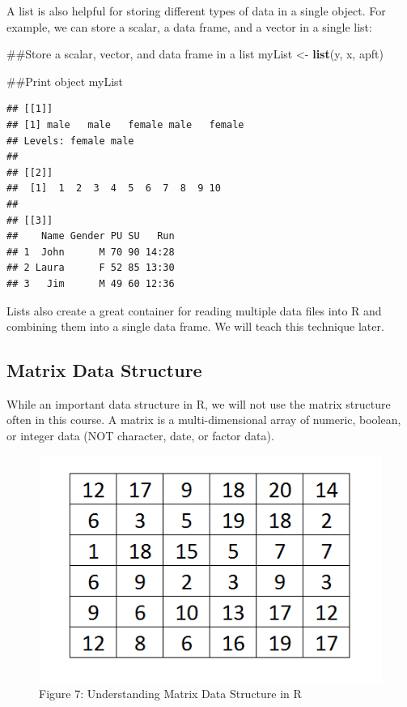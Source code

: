 \documentclass[]{book}
\newenvironment{Shaded}{\begin{snugshade}}{\end{snugshade}}
\newcommand{\KeywordTok}[1]{\textcolor[rgb]{0.13,0.29,0.53}{\textbf{{#1}}}}
\newcommand{\StringTok}[1]{\textcolor[rgb]{0.31,0.60,0.02}{{#1}}}
\newcommand{\NormalTok}[1]{{#1}}
\begin{document}
A list is also helpful for storing different types of data in a single
object. For example, we can store a scalar, a data frame, and a vector
in a single list:

\begin{Shaded}
\begin{Highlighting}[]
\NormalTok{##Store a scalar, vector, and data frame in a list}
\NormalTok{myList <-}\StringTok{ }\KeywordTok{list}\NormalTok{(y, x, apft)}

\NormalTok{##Print object}
\NormalTok{myList}
\end{Highlighting}
\end{Shaded}

\begin{verbatim}
## [[1]]
## [1] male   male   female male   female
## Levels: female male
## 
## [[2]]
##  [1]  1  2  3  4  5  6  7  8  9 10
## 
## [[3]]
##    Name Gender PU SU   Run
## 1  John      M 70 90 14:28
## 2 Laura      F 52 85 13:30
## 3   Jim      M 49 60 12:36
\end{verbatim}

Lists also create a great container for reading multiple data files into
R and combining them into a single data frame. We will teach this
technique later.

\subsection{Matrix Data Structure}\label{matrix-data-structure}

While an important data structure in R, we will not use the matrix
structure often in this course. A matrix is a multi-dimensional array of
numeric, boolean, or integer data (NOT character, date, or factor data).

\begin{figure}[htbp]
\centering
\includegraphics{matrix.PNG}
\caption{Figure 7: Understanding Matrix Data Structure in R}
\end{figure}
\end{document}
